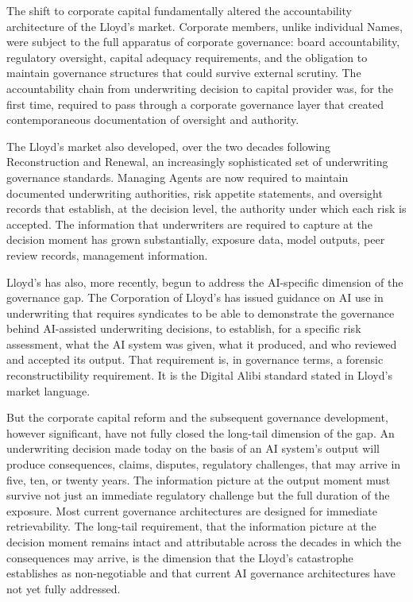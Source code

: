 The shift to corporate capital fundamentally altered the accountability architecture of the Lloyd's market. Corporate members, unlike individual Names, were subject to the full apparatus of corporate governance: board accountability, regulatory oversight, capital adequacy requirements, and the obligation to maintain governance structures that could survive external scrutiny. The accountability chain from underwriting decision to capital provider was, for the first time, required to pass through a corporate governance layer that created contemporaneous documentation of oversight and authority.

The Lloyd's market also developed, over the two decades following Reconstruction and Renewal, an increasingly sophisticated set of underwriting governance standards. Managing Agents are now required to maintain documented underwriting authorities, risk appetite statements, and oversight records that establish, at the decision level, the authority under which each risk is accepted. The information that underwriters are required to capture at the decision moment has grown substantially, exposure data, model outputs, peer review records, management information.

Lloyd's has also, more recently, begun to address the AI-specific dimension of the governance gap. The Corporation of Lloyd's has issued guidance on AI use in underwriting that requires syndicates to be able to demonstrate the governance behind AI-assisted underwriting decisions, to establish, for a specific risk assessment, what the AI system was given, what it produced, and who reviewed and accepted its output. That requirement is, in governance terms, a forensic reconstructibility requirement. It is the Digital Alibi standard stated in Lloyd's market language.

But the corporate capital reform and the subsequent governance development, however significant, have not fully closed the long-tail dimension of the gap. An underwriting decision made today on the basis of an AI system's output will produce consequences, claims, disputes, regulatory challenges, that may arrive in five, ten, or twenty years. The information picture at the output moment must survive not just an immediate regulatory challenge but the full duration of the exposure. Most current governance architectures are designed for immediate retrievability. The long-tail requirement, that the information picture at the decision moment remains intact and attributable across the decades in which the consequences may arrive, is the dimension that the Lloyd's catastrophe establishes as non-negotiable and that current AI governance architectures have not yet fully addressed.

